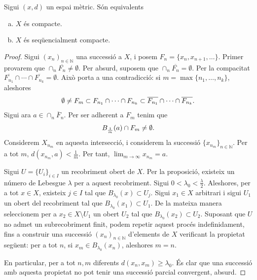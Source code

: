 \documentclass[../main.tex]{subfiles}
\begin{document}
\begin{ter}
\label{ter:compactesiisequencialmentcompacte} Sigui $(x,d)$ un espai mètric. Són equivalents
\begin{enumerate}[(a)]
    \item $X$ és compacte.
    \item $X$ és seqüencialment compacte.
\end{enumerate}
\end{ter}
\begin{proof}
 Sigui $(x_n)_{n\in\mathbb{N}}$ una successió a $X$, i posem $F_n = \{x_n,x_{n+1},\ldots\}$. Primer provarem que $\cap_n \overline{F_n}\not=\emptyset$. Per absurd, suposem que  $\cap_n\overline{F_n}=\emptyset$. Per la compacitat $\overline{F_{n_1}}\cap\cdots\cap \overline{F_{n_k}}=\emptyset$. Això porta a una contradicció: si $m = \max\{n_1,\ldots,n_k\}$, aleshores
\begin{equation}
    \notag
    \emptyset\not= F_m\subset F_{n_1}\cap \cdots\cap F_{n_k}\subset \overline{F_{n_1}}\cap\cdots\cap \overline{F_{n_k}}.
\end{equation}
Sigui ara $a\in\cap_n \overline{F}_n$. Per ser adherent a $F_m$ tenim que
\begin{equation}
    \notag
    B_{\frac{1}{m}}(a)\cap F_m\not=\emptyset.
\end{equation}
Considerem $X_{n_m}$ en aquesta intersecció, i considerem la successió $\{x_{n_m}\}_{n\in\mathbb{N}}$. Per a tot $m$, $d(x_{n_m},a)<\frac{1}{m}$. Per tant, $\displaystyle\lim_{m\rightarrow\infty}x_{n_m}=a$.

 Sigui $U = \{U_i\}_{i\in I}$ un recobriment obert de $X$. Per la proposició, existeix un número de Lebesgue $\lambda$ per a aquest recobriment. Sigui $0<\lambda_0<\frac{\lambda}{2}$. Aleshores, per a tot $x\in X$, existeix $j\in I$ tal que $B_{\lambda_0}(x)\subset U_j$. Sigui $x_1\in X$ arbitrari i sigui $U_1$ un obert del recobriment tal que $B_{\lambda_0}(x_1)\subset U_1$. De la mateixa manera seleccionem per a $x_2\in X\setminus U_1$ un obert $U_2$ tal que $B_{\lambda_0}(x_2)\subset U_2$. Suposant que $U$ no admet un subrecobriment finit, podem repetir aquest procés indefinidament, fins a construir una successió $(x_n)_{n\in\mathbb{N}}$ d'elements de $X$ verificant la propietat següent: per a tot $n$, si $x_m\in B_{\lambda_0}(x_n)$, aleshores $m=n$.

En particular, per a tot $n,m$ diferents $d(x_n,x_m)\geq \lambda_0$. És clar que una successió amb aquesta propietat no pot tenir una successió parcial convergent, absurd.
\end{proof}
\end{document}
